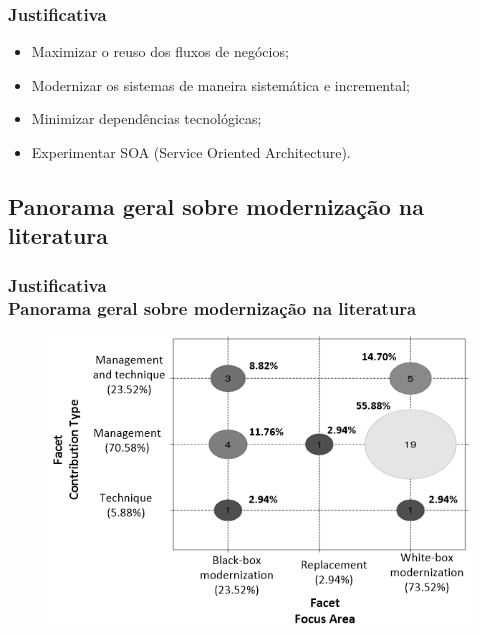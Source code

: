 \documentclass{beamer}
\begin{document}
\begin{frame}
  \frametitle{Justificativa}
  
    \begin{itemize}
       \item<1->Maximizar o reuso dos fluxos de negócios;
       \item<1->Modernizar os sistemas de maneira sistemática e incremental;
       \item<1->Minimizar dependências tecnológicas; 
       \item<1->Experimentar SOA (Service Oriented Architecture).
    \end{itemize}
    
\end{frame}


\subsection{Panorama geral sobre modernização na literatura}


\begin{frame}
  \frametitle{Justificativa \\ \small{Panorama geral sobre modernização na literatura}}

  	
	\begin{figure}
	\centering
		\includegraphics[scale=0.45]{img/bubble_diagram.png}
	\end{figure}
  
\end{frame}



\end{document}
